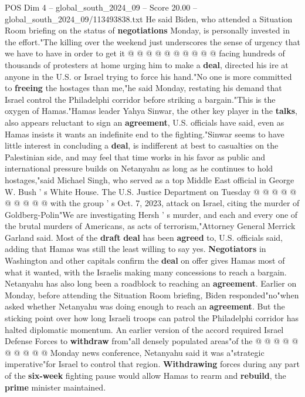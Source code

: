 \begin{textsample}{POS Dim 4 – global\_south\_2024\_09 – Score 20.00 – global\_south\_2024\_09/113493838.txt}
He said Biden, who attended a Situation Room briefing on the status of \textbf{negotiations} Monday, is personally invested in the effort."The killing over the weekend just underscores the sense of urgency that we have to have in order to get it @ @ @ @ @ @ @ @ @ @ facing hundreds of thousands of protesters at home urging him to make a \textbf{deal}, directed his ire at anyone in the U.S. or Israel trying to force his hand."No one is more committed to \textbf{freeing} the hostages than me,"he said Monday, restating his demand that Israel control the Philadelphi corridor before striking a bargain."This is the oxygen of Hamas."Hamas leader Yahya Sinwar, the other key player in the \textbf{talks}, also appears reluctant to sign an \textbf{agreement}, U.S. officials have said, even as Hamas insists it wants an indefinite end to the fighting."Sinwar seems to have little interest in concluding a \textbf{deal}, is indifferent at best to casualties on the Palestinian side, and may feel that time works in his favor as public and international pressure builds on Netanyahu as long as he continues to hold hostages,"said Michael Singh, who served as a top Middle East official in George W.
Bush ' s White House.
The U.S.
Justice Department on Tuesday @ @ @ @ @ @ @ @ @ @ with the group ' s Oct. 7, 2023, attack on Israel, citing the murder of Goldberg-Polin"We are investigating Hersh ' s murder, and each and every one of the brutal murders of Americans, as acts of terrorism,"Attorney General Merrick Garland said.
Most of the \textbf{draft} \textbf{deal} has been \textbf{agreed} to, U.S. officials said, adding that Hamas was still the least willing to say yes. \textbf{Negotiators} in Washington and other capitals confirm the \textbf{deal} on offer gives Hamas most of what it wanted, with the Israelis making many concessions to reach a bargain.
Netanyahu has also long been a roadblock to reaching an \textbf{agreement}.
Earlier on Monday, before attending the Situation Room briefing, Biden responded"no"when asked whether Netanyahu was doing enough to reach an \textbf{agreement}.
But the sticking point over how long Israeli troops can patrol the Philadelphi corridor has halted diplomatic momentum.
An earlier version of the accord required Israel Defense Forces to \textbf{withdraw} from"all densely populated areas"of the @ @ @ @ @ @ @ @ @ @ Monday news conference, Netanyahu said it was a"strategic imperative"for Israel to control that region. \textbf{Withdrawing} forces during any part of the \textbf{six-week} fighting pause would allow Hamas to rearm and \textbf{rebuild}, the \textbf{prime} minister maintained.

\end{textsample}
